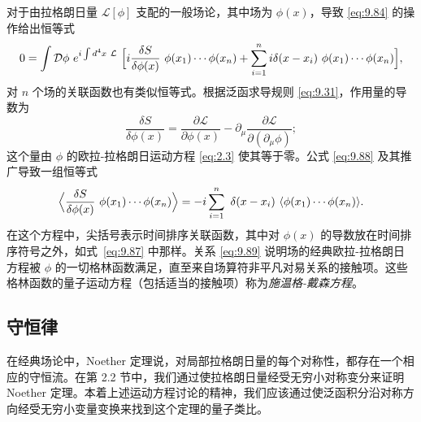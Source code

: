 对于由拉格朗日量 $\mathcal{L}[\phi]$ 支配的一般场论，其中场为 $\phi(x)$，导致 \eqref{eq:9.84} 的操作给出恒等式
\begin{equation}
  0 = \int \mathcal{D}\phi\ e^{i\int d^4x\ \mathcal{L}}\ \Bigl[
    i\frac{\delta S}{\delta\phi(x)}\ \phi(x_1)\cdots\phi(x_n)
    + \sum_{i=1}^{n} i\delta(x-x_i)\ \phi(x_1)\cdots\phi(x_n) \Bigr] ,
  \label{eq:9.88}
\end{equation}
对 $n$ 个场的关联函数也有类似恒等式。根据泛函求导规则 \eqref{eq:9.31}，作用量的导数为
\begin{equation}
  \frac{\delta S}{\delta\phi(x)} = \frac{\partial\mathcal{L}}
    {\partial\phi(x)} - \partial_\mu
      \frac{\partial\mathcal{L}}{\partial(\partial_\mu\phi)} ;
\end{equation}
这个量由 $\phi$ 的欧拉-拉格朗日运动方程 \eqref{eq:2.3} 使其等于零。公式 \eqref{eq:9.88} 及其推广导致一组恒等式
\begin{equation}
  \Bigl\langle \frac{\delta S}{\delta\phi(x)}\ \phi(x_1)\cdots\phi(x_n)
    \Bigr\rangle = -i\sum_{i=1}^{n}\ \delta(x-x_i)\
    \langle \phi(x_1)\cdots\phi(x_n) \rangle .
  \label{eq:9.89}
\end{equation}
在这个方程中，尖括号表示时间排序关联函数，其中对 $\phi(x)$ 的导数放在时间排序符号之外，如式~\eqref{eq:9.87} 中那样。关系 \eqref{eq:9.89} 说明场的经典欧拉-拉格朗日方程被 $\phi$ 的一切格林函数满足，直至来自场算符非平凡对易关系的接触项。这些格林函数的量子运动方程（包括适当的接触项）称为\emph{施温格-戴森方程}。

\subsection{守恒律}

在经典场论中，Noether 定理说，对局部拉格朗日量的每个对称性，都存在一个相应的守恒流。在第 2.2 节中，我们通过使拉格朗日量经受无穷小对称变分来证明 Noether 定理。本着上述运动方程讨论的精神，我们应该通过使泛函积分沿对称方向经受无穷小变量变换来找到这个定理的量子类比。

